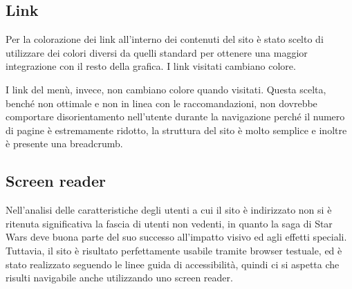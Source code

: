 \subsection{Link}
Per la colorazione dei link all'interno dei contenuti del sito è stato scelto di utilizzare dei colori diversi da quelli standard per ottenere una maggior integrazione con il resto della grafica. I link visitati cambiano colore.

I link del menù, invece, non cambiano colore quando visitati. Questa scelta, benché non ottimale e non in linea con le raccomandazioni, non dovrebbe comportare disorientamento nell'utente durante la navigazione perché il numero di pagine è estremamente ridotto, la struttura del sito è molto semplice e inoltre è presente una breadcrumb.

\subsection{Screen reader}
Nell'analisi delle caratteristiche degli utenti a cui il sito è indirizzato non si è ritenuta significativa la fascia di utenti non vedenti, in quanto la saga di Star Wars deve buona parte del suo successo all'impatto visivo ed agli effetti speciali. \newline
Tuttavia, il sito è risultato perfettamente usabile tramite browser testuale, ed è stato realizzato seguendo le linee guida di accessibilità, quindi ci si aspetta che risulti navigabile anche utilizzando uno screen reader.

